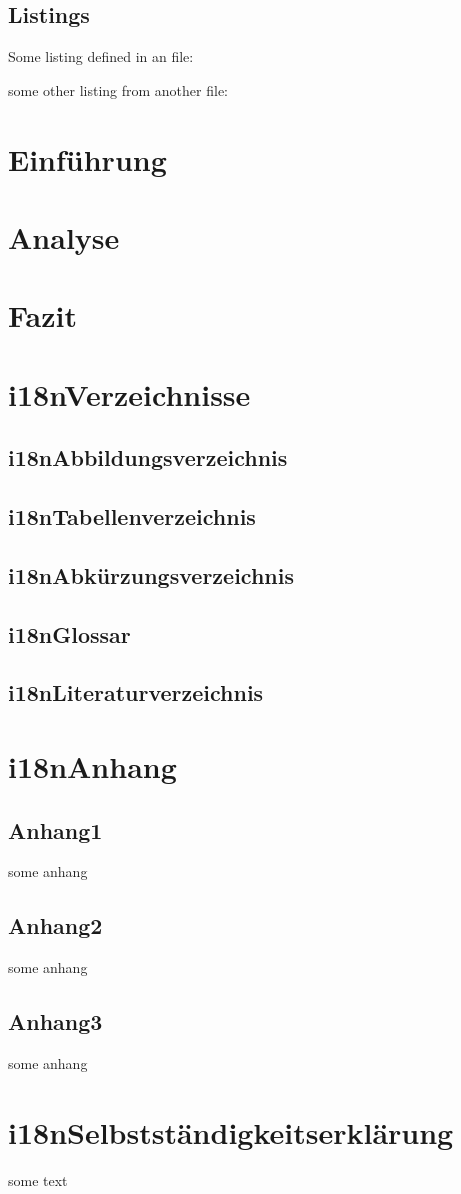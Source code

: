 \documentclass{report}
\makeatletter
\renewcommand\listoftables{
    \@starttoc{lot}
}
\renewcommand\listoffigures{
    \@starttoc{lof}
}
\makeatother
\begin{document}
\section{Listings}
Some listing defined in an file:

some other listing from another file:


\chapter{Einführung}
\lipsum

\chapter{Analyse}
\lipsum

\chapter{Fazit}
\lipsum

\chapter{i18nVerzeichnisse}

\section{i18nAbbildungsverzeichnis}
\listoffigures
\newpage

\section{i18nTabellenverzeichnis}
\listoftables
\newpage

\section{i18nAbkürzungsverzeichnis}
\printacronyms
\newpage

\section{i18nGlossar}
\printglossary
\newpage

\section{i18nLiteraturverzeichnis}
\printbibliography[heading=none]

\chapter{i18nAnhang}
\section{Anhang1}
some anhang
\section{Anhang2}
some anhang
\section{Anhang3}
some anhang

\chapter{i18nSelbstständigkeitserklärung}
some text
\end{document}
